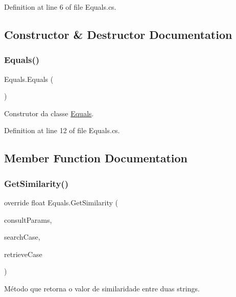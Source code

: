 Definition at line 6 of file Equals.\+cs.



\subsection{Constructor \& Destructor Documentation}
\hypertarget{class_equals_a9ddef758a33b1c30e85a72b3c4db21fc}{}\label{class_equals_a9ddef758a33b1c30e85a72b3c4db21fc} 
\subsubsection{\texorpdfstring{Equals()}{Equals()}}
{\footnotesize\ttfamily Equals.\+Equals (\begin{DoxyParamCaption}{ }\end{DoxyParamCaption})}



Construtor da classe \hyperlink{class_equals}{Equals}. 



Definition at line 12 of file Equals.\+cs.



\subsection{Member Function Documentation}
\hypertarget{class_equals_a1b7c994cee3bf4ff55f6eaef5f31c871}{}\label{class_equals_a1b7c994cee3bf4ff55f6eaef5f31c871} 
\subsubsection{\texorpdfstring{Get\+Similarity()}{GetSimilarity()}}
{\footnotesize\ttfamily override float Equals.\+Get\+Similarity (\begin{DoxyParamCaption}\item[{\hyperlink{class_consult_params}{Consult\+Params}}]{consult\+Params,  }\item[{\hyperlink{class_case}{Case}}]{search\+Case,  }\item[{\hyperlink{class_case}{Case}}]{retrieve\+Case }\end{DoxyParamCaption})\hspace{0.3cm}{\ttfamily [virtual]}}



Método que retorna o valor de similaridade entre duas strings. 


